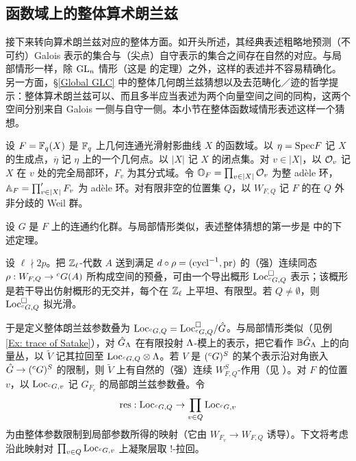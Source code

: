 
\subsection{函数域上的整体算术朗兰兹}\label{S: Global Langlands function fields}

接下来转向算术朗兰兹对应的整体方面。如开头所述，其经典表述粗略地预测（不可约）Galois 表示的集合与（尖点）自守表示的集合之间存在自然的对应。与局部情形一样，除 ${\operatorname{GL}}_n$ 情形（这是 \cite{Lafforgue-GLn} 的定理）之外，这样的表述并不容易精确化。另一方面，\S\ref{Global GLC} 中的整体几何朗兰兹猜想以及去范畴化／迹的哲学提示：整体算术朗兰兹可以、而且多半应当表述为两个向量空间之间的同构，这两个空间分别来自 Galois 一侧与自守一侧。本小节在整体函数域情形表述这样一个猜想。

设 $F={\mathbb F}_q(X)$ 是 ${\mathbb F}_q$ 上几何连通光滑射影曲线 $X$ 的函数域。以 $\eta={\operatorname{Spec}} F$ 记 $X$ 的生成点，$\overline\eta$ 记 $\eta$ 上的一个几何点。以 $|X|$ 记 $X$ 的闭点集。对 $v\in |X|$，以 ${\mathcal O}_v$ 记 $X$ 在 $v$ 处的完全局部环，$F_v$ 为其分式域。令 ${\mathbb O}_F=\prod_{v\in|X|}{\mathcal O}_v$ 为整 adèle 环，${\mathbb A}_F=\prod'_{v\in|X|}F_v$ 为 adèle 环。对有限非空的位置集 $Q$，以 $W_{F,Q}$ 记 $F$ 的在 $Q$ 外非分歧的 Weil 群。

设 $G$ 是 $F$ 上的连通约化群。与局部情形类似，表述整体猜想的第一步是 \cite{Zhu-Conjecture} 中的下述定理。

\begin{thm}
设 $\ell\nmid 2p$。把 ${\mathbb Z}_\ell$-代数 $A$ 送到满足 $d\circ\rho=({\operatorname{cycl}}^{-1},{\operatorname{pr}})$ 的（强）连续同态 $\rho: W_{F,Q}\to {}^cG(A)$ 所构成空间的预叠，可由一个导出概形 ${\operatorname{Loc}}_{{}^cG,Q}^\Box$ 表示；该概形是若干导出仿射概形的无交并，每个在 ${\mathbb Z}_\ell$ 上平坦、有限型。若 $Q\neq\emptyset$，则 ${\operatorname{Loc}}_{{}^cG,Q}^\Box$ 拟光滑。
\end{thm}

于是定义整体朗兰兹参数叠为 ${\operatorname{Loc}}_{{}^cG,Q}={\operatorname{Loc}}_{{}^cG,Q}^\Box/\hat{G}$。与局部情形类似（见例 \ref{Ex: trace of Satake}），对 $\hat{G}_{\Lambda}$ 在有限投射 ${\Lambda}$-模上的表示，把它看作 ${\mathbb B}\hat{G}_{\Lambda}$ 上的向量丛，以 $\widetilde V$ 记其拉回至 ${\operatorname{Loc}}_{{}^cG,Q}\otimes{\Lambda}$。若 $V$ 是 $({}^cG)^S$ 的某个表示沿对角嵌入 $\hat{G}\to ({}^cG)^S$ 的限制，则 $\widetilde V$ 上有自然的（强）连续 $W_{F,Q}^S$-作用（见 \cite[Sect. 2.4]{Zhu-Conjecture}）。对 $F$ 的位置 $v$，以 ${\operatorname{Loc}}_{{}^cG,v}$ 记 $G_{F_v}$ 的局部朗兰兹参数叠。令
\[
{\operatorname{res}}: {\operatorname{Loc}}_{{}^cG,Q}\to \prod_{v\in Q}{\operatorname{Loc}}_{{}^cG,v}
\]
为由整体参数限制到局部参数所得的映射（它由 $W_{F_v}\to W_{F,Q}$ 诱导）。下文将考虑沿此映射对 $\prod_{v\in Q}{\operatorname{Loc}}_{{}^cG,v}$ 上凝聚层取 $!$-拉回。

